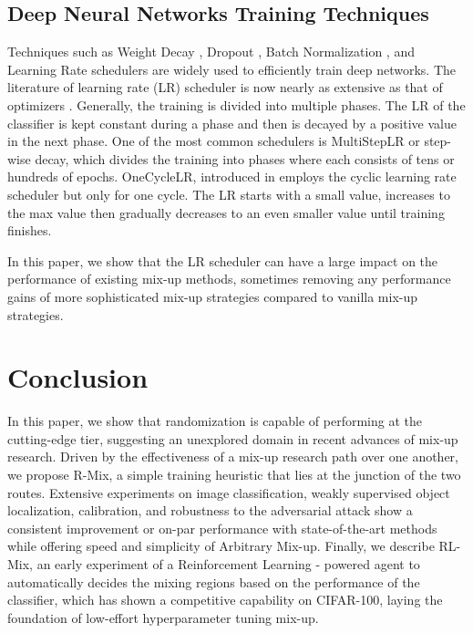 \documentclass[letterpaper]{article} \usepackage[submission]{aaai23}  \usepackage{times}  \usepackage{helvet}  \usepackage{courier}  \usepackage[hyphens]{url}  \usepackage{graphicx} \urlstyle{rm} \def\UrlFont{\rm}  \usepackage{natbib}  \usepackage{caption} \frenchspacing  \setlength{\pdfpagewidth}{8.5in} \setlength{\pdfpageheight}{11in}
\newcommand{\rrlmix}{{R-Mix}}
\newcommand{\cifar}{CIFAR-100}
\begin{document}
\subsection{Deep Neural Networks Training Techniques}
Techniques such as Weight Decay \cite{Goodfellow-et-al-2016}, Dropout \cite{dropout}, Batch Normalization \cite{ioffe2015batch}, and Learning Rate schedulers are widely used to efficiently train deep networks.
The literature of learning rate (LR) scheduler is now nearly as extensive as that of optimizers \cite{pmlr-v139-schmidt21a}. Generally, the training is divided into multiple phases. The LR of the classifier is kept constant during a phase and then is decayed by a positive value in the next phase. One of the most common schedulers is MultiStepLR \cite{Goodfellow-et-al-2016,zhang2021dive} or step-wise decay, which divides the training into phases where each consists of tens or hundreds of epochs.
OneCycleLR, introduced in \cite{smith2018superconvergence} employs the cyclic learning rate scheduler \cite{smith2017cyclical} but only for one cycle. The LR starts with a small value, increases to the max value then gradually decreases to an even smaller value until training finishes.

In this paper, we show that the LR scheduler can have a large impact on the performance of existing mix-up methods, sometimes removing any performance gains of more sophisticated mix-up strategies compared to vanilla mix-up strategies. 
\section{Conclusion}
\label{sec:concl}
In this paper, we show that randomization is capable of performing at the cutting-edge tier, suggesting an unexplored domain in recent advances of mix-up research. Driven by the effectiveness of a mix-up research path over one another, we propose \rrlmix{}, a simple training heuristic that lies at the junction of the two routes. Extensive experiments on image classification, weakly supervised object localization, calibration, and robustness to the adversarial attack show a consistent improvement or on-par performance with state-of-the-art methods while offering speed and simplicity of Arbitrary Mix-up.
Finally, we describe RL-Mix, an early experiment of a Reinforcement Learning - powered agent to automatically decides the mixing regions based on the performance of the classifier, which has shown a competitive capability on \cifar{}, laying the foundation of low-effort hyperparameter tuning mix-up.
\end{document}
